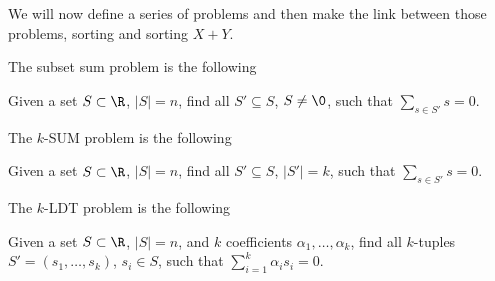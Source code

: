 We will now define a series of problems and then make the link between those
problems, sorting and sorting $X + Y$.

The subset sum problem is the following

\begin{problem}
Given a set $S \subset \R$, $\left\vert{S}\right\vert = n$, find all
$S' \subseteq S$, $S \neq \0$, such that $\sum\limits_{s \in S'} s = 0$.
\end{problem}


The $k$-SUM problem is the following

\begin{problem}
Given a set $S \subset \R$, $\left\vert{S}\right\vert = n$, find all
$S' \subseteq S$, $\left\vert{S'}\right\vert = k$, such that $\sum\limits_{s
\in S'} s = 0$.
\end{problem}


The $k$-LDT problem is the following

\begin{problem}
Given a set $S \subset \R$, $\left\vert{S}\right\vert = n$, and $k$
coefficients $\alpha_1, \dots, \alpha_k$, find all $k$-tuples
$S' = (s_1, \dots, s_k)$, $s_i \in S$, such that
$\sum_{i=1}^{k} \alpha_i s_i = 0$.
\end{problem}

